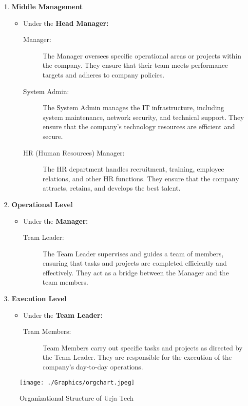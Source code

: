 \begin{enumerate}
            \item \textbf{Middle Management}
            \begin{itemize}
                \item Under the \textbf{Head Manager:}
            \begin{description}
                \item[Manager: ] The Manager oversees specific operational areas or projects within the company. They ensure that their team meets performance targets and adheres to company policies.
                \item[System Admin: ] The System Admin manages the IT infrastructure, including system maintenance, network security, and technical support. They ensure that the company’s technology resources are efficient and secure.
                \item[HR (Human Resources) Manager:] The HR department handles recruitment, training, employee relations, and other HR functions. They ensure that the company attracts, retains, and develops the best talent.
            \end{description}
            \end{itemize}
            \item \textbf{Operational Level}
            \begin{itemize}
                \item Under the \textbf{Manager:}
            \begin{description}
                \item[Team Leader: ] The Team Leader supervises and guides a team of members, ensuring that tasks and projects are completed efficiently and effectively. They act as a bridge between the Manager and the team members.
            \end{description}
            \end{itemize}
            \item \textbf{Execution Level}
            \begin{itemize}
                \item Under the \textbf{Team Leader:}
            \begin{description}
                \item[Team Members:] Team Members carry out specific tasks and projects as directed by the Team Leader. They are responsible for the execution of the company’s day-to-day operations.
            \end{description}
            \end{itemize}
        \end{enumerate}
        \begin{figure}[H]
          
          \texttt{[image: ./Graphics/orgchart.jpeg]}
          \caption{Organizational Structure of Urja Tech}
          \label{fig:orgchart}
        \end{figure}
        

